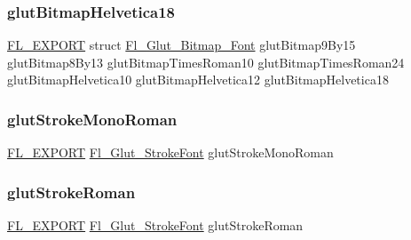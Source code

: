 \mbox{\label{glut_8_h_ad57d041683756c27cdbb7a61285aacb6}} 
\subsubsection{\texorpdfstring{glut\+Bitmap\+Helvetica18}{glutBitmapHelvetica18}}
{\footnotesize\ttfamily \hyperlink{_fl___export_8_h_aa9ba29a18aee9d738370a06eeb4470fc}{F\+L\+\_\+\+E\+X\+P\+O\+RT} struct \hyperlink{struct_fl___glut___bitmap___font}{Fl\+\_\+\+Glut\+\_\+\+Bitmap\+\_\+\+Font} glut\+Bitmap9\+By15 glut\+Bitmap8\+By13 glut\+Bitmap\+Times\+Roman10 glut\+Bitmap\+Times\+Roman24 glut\+Bitmap\+Helvetica10 glut\+Bitmap\+Helvetica12 glut\+Bitmap\+Helvetica18}

\mbox{\label{glut_8_h_a4e03095fb5f41b25ebcef0a4e38f6ead}} 
\subsubsection{\texorpdfstring{glut\+Stroke\+Mono\+Roman}{glutStrokeMonoRoman}}
{\footnotesize\ttfamily \hyperlink{_fl___export_8_h_aa9ba29a18aee9d738370a06eeb4470fc}{F\+L\+\_\+\+E\+X\+P\+O\+RT} \hyperlink{struct_fl___glut___stroke_font}{Fl\+\_\+\+Glut\+\_\+\+Stroke\+Font} glut\+Stroke\+Mono\+Roman}

\mbox{\label{glut_8_h_a6cbb84959750222990a4b0403109897e}} 
\subsubsection{\texorpdfstring{glut\+Stroke\+Roman}{glutStrokeRoman}}
{\footnotesize\ttfamily \hyperlink{_fl___export_8_h_aa9ba29a18aee9d738370a06eeb4470fc}{F\+L\+\_\+\+E\+X\+P\+O\+RT} \hyperlink{struct_fl___glut___stroke_font}{Fl\+\_\+\+Glut\+\_\+\+Stroke\+Font} glut\+Stroke\+Roman}

